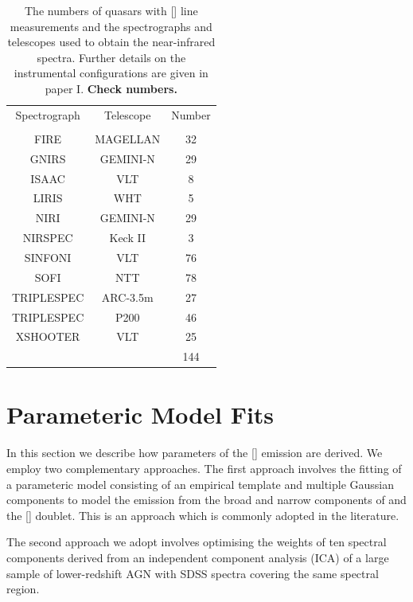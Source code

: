 \begin{table}
  \centering
  \small 
  \caption{The numbers of quasars with [] line measurements and the spectrographs and telescopes used to obtain the near-infrared spectra. Further details on the instrumental configurations are given in paper I. {\bf Check numbers.} }
  \label{tab:specnums}
    \begin{tabular}{ccc} 
    \hline
    Spectrograph & Telescope & Number \\
                 &           & \\
    \hline
    FIRE         & MAGELLAN  & 32 \\
    GNIRS        & GEMINI-N  & 29 \\
    ISAAC        & VLT       & 8 \\
    LIRIS        & WHT       & 5 \\
    NIRI         & GEMINI-N  & 29 \\
    NIRSPEC      & Keck II   & 3 \\
    SINFONI      & VLT       & 76 \\
    SOFI         & NTT       & 78 \\
    TRIPLESPEC   & ARC-3.5m  & 27 \\
    TRIPLESPEC   & P200      & 46 \\
    XSHOOTER     & VLT       & 25 \\
    \hline
    & & 144 \\
    \hline
    \end{tabular}
\end{table} 

\section{Parameteric Model Fits}

In this section we describe how parameters of the [] emission are derived. 
We employ two complementary approaches.
The first approach involves the fitting of a parameteric model consisting of an empirical  template and multiple Gaussian components to model the emission from the broad and narrow components of \hb and the [] doublet. 
This is an approach which is commonly adopted in the literature. 

The second approach we adopt involves optimising the weights of ten spectral components derived from an independent component analysis (ICA) of a large sample of lower-redshift AGN with SDSS spectra covering the same spectral region. 

